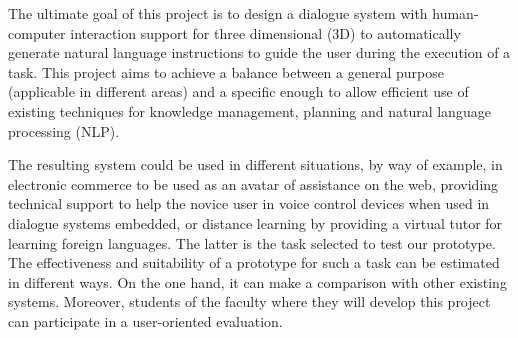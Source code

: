 


The ultimate goal of this project is to design a dialogue system with
human-computer interaction support for three dimensional (3D) to automatically
generate natural language instructions to guide the user during the execution of
a task. This project aims to achieve a balance between a general purpose
(applicable in different areas) and a specific enough to allow efficient use of
existing techniques for knowledge management, planning and natural language
processing (NLP).
% 

The resulting system could be used in different situations, by way of example,
in electronic commerce to be used as an avatar of assistance on the web,
providing technical support to help the novice user in voice control devices
when used in dialogue systems embedded, or distance learning by providing a
virtual tutor for learning foreign languages. The latter is the task selected to
test our prototype. The effectiveness and suitability of a prototype for such a
task can be estimated in different ways. On the one hand, it can make a
comparison with other existing systems. Moreover, students of the faculty where
they will develop this project can participate in a user-oriented evaluation. 
% 

